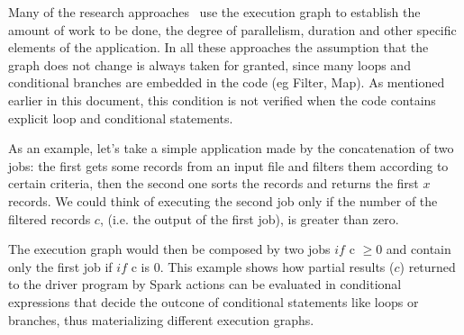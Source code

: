 Many of the research approaches~\cite{gibilisco2016stage,Sidhanta2016, dSpark, nfm} use the execution graph to establish the amount of work to be done, the degree of parallelism, duration and other specific elements of the application. In all these approaches the assumption that the graph does not change is always taken for granted, since many loops and conditional branches are embedded in the code (eg Filter, Map). As mentioned earlier in this document, this condition is not verified when the code contains explicit loop and conditional statements.


As an example, let's take a simple application made by the concatenation of two jobs: the first  gets some records from an input file and filters them according to certain criteria, then the  second one sorts the records and returns the first $x$ records. We could think of executing the second job only if the number of the filtered records $c$, (i.e. the output of the first job), is greater than zero. 

The execution graph would then be composed by two jobs $if$ c $\geq 0$ and contain only the first job if  $if$ c is $0$. This example shows how partial results ($c$)  returned to the driver program by Spark actions can be evaluated in conditional expressions that decide the outcone of conditional statements like loops or branches, thus materializing different execution graphs.

